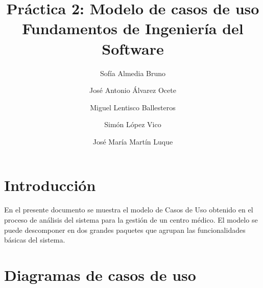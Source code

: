 \documentclass[11pt,a4paper]{article}
\title{Práctica 2: Modelo de casos de uso \large Fundamentos de Ingeniería del Software}
\author{Sofía Almedia Bruno \and José Antonio Álvarez Ocete \and Miguel Lentisco Ballesteros \and Simón López Vico \and José María Martín Luque}
\begin{document}
\maketitle

\section{Introducción}

En el presente documento se muestra el modelo de Casos de Uso obtenido en el proceso de análisis
del sistema para la gestión de un centro médico. El modelo se puede descomponer en dos grandes
paquetes que agrupan las funcionalidades básicas del sistema.

\section{Diagramas de casos de uso} %
\end{document}
